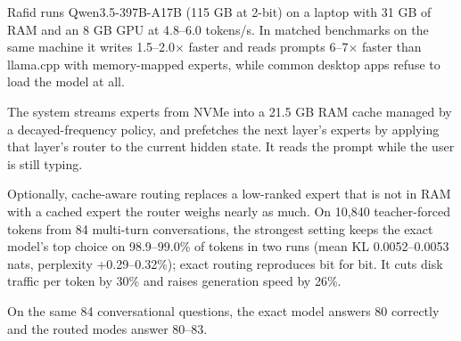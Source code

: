 Rafid runs Qwen3.5-397B-A17B (115 GB at 2-bit) on a laptop with 31 GB of RAM and an 8 GB GPU at 4.8--6.0 tokens/s. In matched benchmarks on the same machine it writes 1.5--2.0$\times$ faster and reads prompts 6--7$\times$ faster than llama.cpp with memory-mapped experts, while common desktop apps refuse to load the model at all.

The system streams experts from NVMe into a 21.5 GB RAM cache managed by a decayed-frequency policy, and prefetches the next layer's experts by applying that layer's router to the current hidden state. It reads the prompt while the user is still typing.

Optionally, cache-aware routing replaces a low-ranked expert that is not in RAM with a cached expert the router weighs nearly as much. On 10,840 teacher-forced tokens from 84 multi-turn conversations, the strongest setting keeps the exact model's top choice on 98.9--99.0\% of tokens in two runs (mean KL 0.0052--0.0053 nats, perplexity +0.29--0.32\%); exact routing reproduces bit for bit. It cuts disk traffic per token by 30\% and raises generation speed by 26\%.

On the same 84 conversational questions, the exact model answers 80 correctly and the routed modes answer 80--83.
